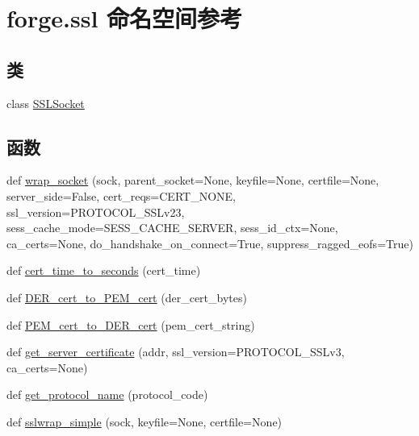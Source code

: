 \hypertarget{namespaceforge_1_1ssl}{}\section{forge.\+ssl 命名空间参考}
\label{namespaceforge_1_1ssl}
\subsection*{类}
\begin{DoxyCompactItemize}
\item 
class \mbox{\hyperlink{classforge_1_1ssl_1_1_s_s_l_socket}{S\+S\+L\+Socket}}
\end{DoxyCompactItemize}
\subsection*{函数}
\begin{DoxyCompactItemize}
\item 
def \mbox{\hyperlink{namespaceforge_1_1ssl_a1cce48a9d7c26cd4e273e092e8a7e988}{wrap\+\_\+socket}} (sock, parent\+\_\+socket=None, keyfile=None, certfile=None, server\+\_\+side=False, cert\+\_\+reqs=C\+E\+R\+T\+\_\+\+N\+O\+NE, ssl\+\_\+version=P\+R\+O\+T\+O\+C\+O\+L\+\_\+\+S\+S\+Lv23, sess\+\_\+cache\+\_\+mode=S\+E\+S\+S\+\_\+\+C\+A\+C\+H\+E\+\_\+\+S\+E\+R\+V\+ER, sess\+\_\+id\+\_\+ctx=None, ca\+\_\+certs=None, do\+\_\+handshake\+\_\+on\+\_\+connect=True, suppress\+\_\+ragged\+\_\+eofs=True)
\item 
def \mbox{\hyperlink{namespaceforge_1_1ssl_ab72480f870ee3cb1c911d2d19a090908}{cert\+\_\+time\+\_\+to\+\_\+seconds}} (cert\+\_\+time)
\item 
def \mbox{\hyperlink{namespaceforge_1_1ssl_a55a2fe3d19271215dcab8f55dc6ac946}{D\+E\+R\+\_\+cert\+\_\+to\+\_\+\+P\+E\+M\+\_\+cert}} (der\+\_\+cert\+\_\+bytes)
\item 
def \mbox{\hyperlink{namespaceforge_1_1ssl_a34b5820befc677dcbed74bd790165cf9}{P\+E\+M\+\_\+cert\+\_\+to\+\_\+\+D\+E\+R\+\_\+cert}} (pem\+\_\+cert\+\_\+string)
\item 
def \mbox{\hyperlink{namespaceforge_1_1ssl_a41cd286f446f5c9233ef630eb8143ed9}{get\+\_\+server\+\_\+certificate}} (addr, ssl\+\_\+version=P\+R\+O\+T\+O\+C\+O\+L\+\_\+\+S\+S\+Lv3, ca\+\_\+certs=None)
\item 
def \mbox{\hyperlink{namespaceforge_1_1ssl_a90c00dd95b4b86d58bfe25634887ba33}{get\+\_\+protocol\+\_\+name}} (protocol\+\_\+code)
\item 
def \mbox{\hyperlink{namespaceforge_1_1ssl_af156eb492f2b672e7e030e7e3deb2024}{sslwrap\+\_\+simple}} (sock, keyfile=None, certfile=None)
\end{DoxyCompactItemize}
